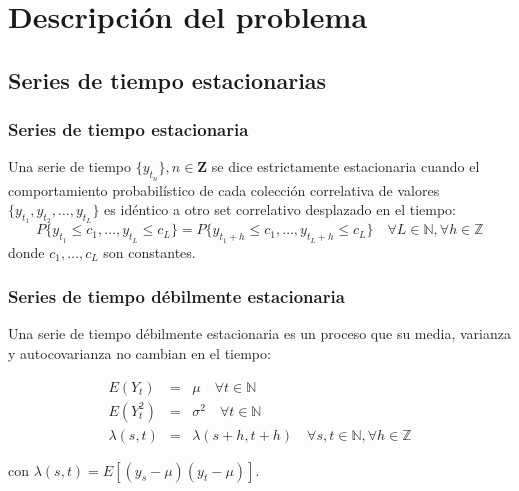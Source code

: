 \documentclass{beamer}
\begin{document}
    \section{Descripción del problema}
        \subsection{Series de tiempo estacionarias}
            \begin{frame}
            \frametitle{Series de tiempo estacionaria}
            Una serie de tiempo $\{y_{t_n}\}, n \in \mathbf{Z}$ se dice estrictamente
            estacionaria cuando el comportamiento probabilístico de cada colección
            correlativa de valores $\{y_{t_1},y_{t_2},\dots,y_{t_L}\}$ es idéntico a otro
            set correlativo desplazado en el tiempo:
            \[ P\{y_{t_1} \leq
            c_1,\dots,y_{t_L} \leq c_L\} = P\{y_{t_1+h} \leq c_1,\dots,y_{t_L+h}
            \leq c_L\}
            \quad \forall L \in \mathbb{N}, \forall h \in \mathbb{Z}\] \noindent donde
            $c_1,\dots,c_L$ son constantes.
            \end{frame}

            \begin{frame}
            \frametitle{Series de tiempo débilmente estacionaria}
            Una serie de tiempo débilmente estacionaria es un proceso que su media,
            varianza y autocovarianza no cambian en el tiempo:
            
            \begin{eqnarray*}
            E(Y_t) &=& \mu  \quad \forall t \in \mathbb{N} \\ E(Y^2_t) &=&
            \sigma^2  \quad \forall t \in \mathbb{N} \\
            \lambda(s,t)&=&\lambda(s+h,t+h) \quad \forall s,t \in \mathbb{N},
            \forall h \in \mathbb{Z}
            \end{eqnarray*}
            
            \noindent con $\lambda(s,t) = E[(y_s-\mu)(y_t - \mu)]$.

            \end{frame}
\end{document}
